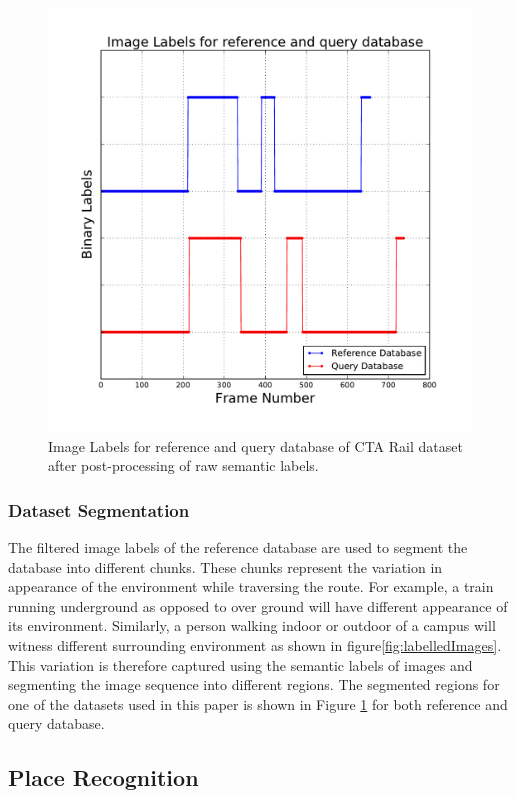 \documentclass[twocolumn]{article}
\begin{document}
\begin{figure}[!htbp]
 \includegraphics[scale=0.45]{cta-rail-imageLabels}
 \caption{Image Labels for reference and query database of CTA Rail dataset after post-processing of raw semantic labels.}
 \label{fig:datasetLabels}
\end{figure}


\subsubsection{Dataset Segmentation}
The filtered image labels of the reference database are used to segment the database into different chunks. These chunks represent the variation in appearance of the environment while traversing the route. For example, a train running underground as opposed to over ground will have different appearance of its environment. Similarly, a person walking indoor or outdoor of a campus will witness different surrounding environment as shown in figure\ref{fig:labelledImages}. This variation is therefore captured using the semantic labels of images and segmenting the image sequence into different regions. The segmented regions for one of the datasets used in this paper is shown in Figure \ref{fig:datasetLabels} for both reference and query database.

\subsection{Place Recognition}
\end{document}
